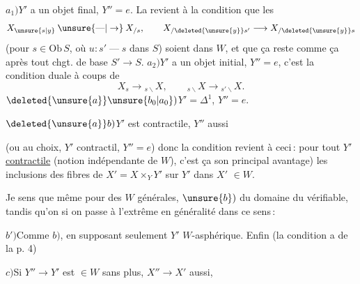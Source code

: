 
$a_1)$\quad $Y'$ a un objet final, $Y''=e$. La  revient  à la condition que les
\[
X_{\unsure{s|y}}\mathbin{\unsure{\text{---}|\to}}X_{/s},\qquad X_{/\deleted{\unsure{y}}s'}\longrightarrow X_{/\deleted{\unsure{y}}s}
\]
(pour $s\in\mathrm{Ob}\,S$, où $u\colon s'\mathbin{\text{---}}s$ dans $S$) soient dans $W$, et que ça reste comme ça après tout chgt. de base $S'\to S$.
$a_2)$\quad $Y'$ a un objet initial, $Y''=e$, c'est la condition duale à coups de
\[
X_s\longrightarrow{}_{s\backslash}X,\qquad{}_{s\backslash}X\longrightarrow{}_{s'\backslash}X.
\]
$\deleted{\unsure{a}}\unsure{b_0|a_0})$\quad $Y'=\mathbb{\Delta}^1$, $Y''=e$.

$\deleted{\unsure{a}}b)$\quad $Y'$ est contractile, $Y''$ aussi

(ou au choix, $Y'$ contractil, $Y''=e$) donc la condition revient à ceci\,: pour tout $Y'$  \uline{contractile} (notion indépendante de $W$), c'est ça son principal avantage) les inclusions des fibres de $X'=X\times_Y Y'$ sur $Y'$ dans $X'$  $\in W$.

Je sens que même pour des $W$ générales, $\unsure{b})$  du domaine du vérifiable, tandis qu'on  si on passe à l'extrême en généralité dans ce sens\,:

$b')$\quad Comme $b)$,   en supposant seulement $Y'$ $W$-asphérique.
Enfin (la condition a de la p. 4)

$c)$\quad Si $Y''\to Y'$ est $\in W$  sans plus, $X''\to X'$ aussi,

